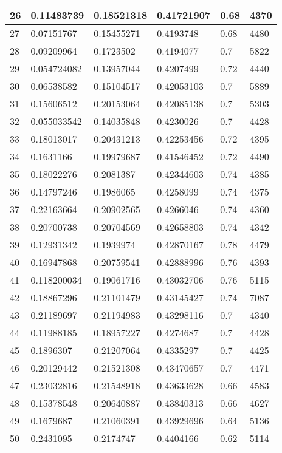 \begin{longtable}{|l|l|l|l|l|l|}
26 & 0.11483739 & 0.18521318 & 0.41721907 & 0.68 & 4370 \\ \hline 
27 & 0.07151767 & 0.15455271 & 0.4193748 & 0.68 & 4480 \\ \hline 
28 & 0.09209964 & 0.1723502 & 0.4194077 & 0.7 & 5822 \\ \hline 
29 & 0.054724082 & 0.13957044 & 0.4207499 & 0.72 & 4440 \\ \hline 
30 & 0.06538582 & 0.15104517 & 0.42053103 & 0.7 & 5889 \\ \hline 
31 & 0.15606512 & 0.20153064 & 0.42085138 & 0.7 & 5303 \\ \hline 
32 & 0.055033542 & 0.14035848 & 0.4230026 & 0.7 & 4428 \\ \hline 
33 & 0.18013017 & 0.20431213 & 0.42253456 & 0.72 & 4395 \\ \hline 
34 & 0.1631166 & 0.19979687 & 0.41546452 & 0.72 & 4490 \\ \hline 
35 & 0.18022276 & 0.2081387 & 0.42344603 & 0.74 & 4385 \\ \hline 
36 & 0.14797246 & 0.1986065 & 0.4258099 & 0.74 & 4375 \\ \hline 
37 & 0.22163664 & 0.20902565 & 0.4266046 & 0.74 & 4360 \\ \hline 
38 & 0.20700738 & 0.20704569 & 0.42658803 & 0.74 & 4342 \\ \hline 
39 & 0.12931342 & 0.1939974 & 0.42870167 & 0.78 & 4479 \\ \hline 
40 & 0.16947868 & 0.20759541 & 0.42888996 & 0.76 & 4393 \\ \hline 
41 & 0.118200034 & 0.19061716 & 0.43032706 & 0.76 & 5115 \\ \hline 
42 & 0.18867296 & 0.21101479 & 0.43145427 & 0.74 & 7087 \\ \hline 
43 & 0.21189697 & 0.21194983 & 0.43298116 & 0.7 & 4340 \\ \hline 
44 & 0.11988185 & 0.18957227 & 0.4274687 & 0.7 & 4428 \\ \hline 
45 & 0.1896307 & 0.21207064 & 0.4335297 & 0.7 & 4425 \\ \hline 
46 & 0.20129442 & 0.21521308 & 0.43470657 & 0.7 & 4471 \\ \hline 
47 & 0.23032816 & 0.21548918 & 0.43633628 & 0.66 & 4583 \\ \hline 
48 & 0.15378548 & 0.20640887 & 0.43840313 & 0.66 & 4627 \\ \hline 
49 & 0.1679687 & 0.21060391 & 0.43929696 & 0.64 & 5136 \\ \hline 
50 & 0.2431095 & 0.2174747 & 0.4404166 & 0.62 & 5114 \\ \hline 
\end{longtable}